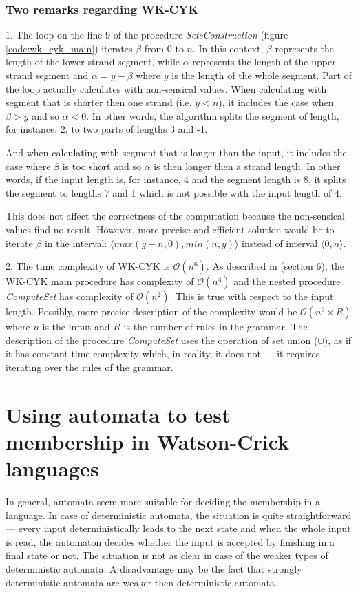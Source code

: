 \subsubsection{Two remarks regarding WK-CYK}
1. The loop on the line 9 of the procedure \textit{SetsConstruction} (figure \ref{code:wk_cyk_main}) iterates $\beta$ from 0 to $n$. In this context, $\beta$ represents the length of the lower strand segment, while $\alpha$ represents the length of the upper strand segment and $\alpha = y - \beta$ where $y$ is the length of the whole segment. Part of the loop actually calculates with non-sensical values. When calculating with segment that is shorter then one strand (i.e. $y < n$), it includes the case when $\beta > y$ and so $\alpha < 0$. In other words, the algorithm splits the segment of length, for instance, 2, to two parts of lengths 3 and -1.

And when calculating with segment that is longer than the input, it includes the case where $\beta$ is too short and so $\alpha$ is then longer then a strand length. In other words, if the input length is, for instance, 4 and the segment length is 8, it splits the segment to lengths 7 and 1 which is not possible with the input length of 4.

This does not affect the correctness of the computation because the non-sensical values find no result. However, more precise and efficient solution would be to iterate $\beta$ in the interval: $\langle max(y-n, 0), min(n, y)\rangle$ instead of interval $\langle 0, n\rangle$.

\medskip

2. The time complexity of WK-CYK is $\mathcal{O}(n^6)$. As described in \cite{WK_CYK} (section 6), the WK-CYK main procedure has complexity of $\mathcal{O}(n^4)$ and the nested procedure \textit{ComputeSet} has complexity of $\mathcal{O}(n^2)$. This is true with respect to the input length. Possibly, more precise description of the complexity would be $\mathcal{O}(n^6 \times R)$ where $n$ is the input and $R$ is the number of rules in the grammar. The description of the procedure \textit{ComputeSet} uses the operation of set union ($\cup$), as if it has constant time complexity which, in reality, it does not --- it requires iterating over the rules of the grammar.

\section{Using automata to test membership in Watson-Crick languages}
In general, automata seem more suitable for deciding the membership in a language. In case of deterministic automata, the situation is quite straightforward --- every input deterministically leads to the next state and when the whole input is read, the automaton decides whether the input is accepted by finishing in a final state or not. The situation is not as clear in case of the weaker types of deterministic automata. A disadvantage may be the fact that strongly deterministic automata are weaker then deterministic automata.

